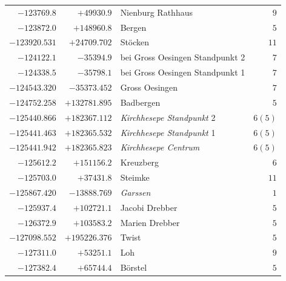 \begin{center}
\begin{tabular}{r|r|p{170pt}|r}
\(-123769.8\)&\(+49930.9\)&Nienburg Rathhaus&\(9\)\\
\(-123872.0\)&\(+148960.8\)&Bergen&\(5\)\\
\(-123920.531\)&\(+24709.702\)&Stöcken&\(11\)\\
\(-124122.1\)&\(-35394.9\)&bei Gross Oesingen Standpunkt 2&\(7\)\\
\(-124338.5\)&\(-35798.1\)&bei Gross Oesingen Standpunkt 1&\(7\)\\
\(-124543.320\)&\(-35373.452\)&Gross Oesingen&\(7\)\\
\(-124752.258\)&\(+132781.895\)&Badbergen&\(5\)\\
\(-125440.866\)&\(+182367.112\)&\textit{Kirchhesepe Standpunkt} 2&\(6 (5)\)\\
\(-125441.463\)&\(+182365.532\)&\textit{Kirchhesepe Standpunkt} 1&\(6 (5)\)\\
\(-125441.942\)&\(+182365.823\)&\textit{Kirchhesepe Centrum}&\(6 (5)\)\\
\(-125612.2\)&\(+151156.2\)&Kreuzberg&\(6\)\\
\(-125703.0\)&\(+37431.8\)&Steimke&\(11\)\\
\(-125867.420\)&\(-13888.769\)&\textit{Garssen}&\(1\)\\
\(-125937.4\)&\(+102721.1\)&Jacobi Drebber&\(5\)\\
\(-126372.9\)&\(+103583.2\)&Marien Drebber&\(5\)\\
\(-127098.552\)&\(+195226.376\)&Twist&\(5\)\\
\(-127311.0\)&\(+53251.1\)&Loh&\(9\)\\
\(-127382.4\)&\(+65744.4\)&Börstel&\(5\)\\
\hline\end{tabular}\endgroup\end{center}

